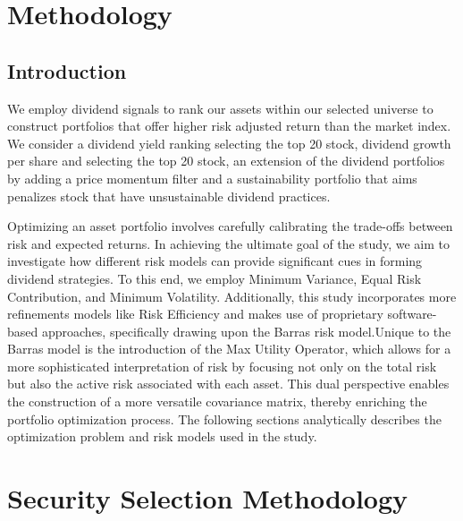 \documentclass[11pt,preprint, authoryear]{elsarticle}
\numberwithin{equation}{section}
\numberwithin{figure}{section}
\numberwithin{table}{section}
\begin{document}
\hypertarget{methodology}{%
\section*{Methodology}\label{methodology}}

\hypertarget{introduction-1}{%
\subsection*{Introduction}\label{introduction-1}}

We employ dividend signals to rank our assets within our selected
universe to construct portfolios that offer higher risk adjusted return
than the market index. We consider a dividend yield ranking selecting
the top 20 stock, dividend growth per share and selecting the top 20
stock, an extension of the dividend portfolios by adding a price
momentum filter and a sustainability portfolio that aims penalizes stock
that have unsustainable dividend practices.

Optimizing an asset portfolio involves carefully calibrating the
trade-offs between risk and expected returns. In achieving the ultimate
goal of the study, we aim to investigate how different risk models can
provide significant cues in forming dividend strategies. To this end, we
employ Minimum Variance, Equal Risk Contribution, and Minimum
Volatility. Additionally, this study incorporates more refinements
models like Risk Efficiency and makes use of proprietary software-based
approaches, specifically drawing upon the Barras risk model.Unique to
the Barras model is the introduction of the Max Utility Operator, which
allows for a more sophisticated interpretation of risk by focusing not
only on the total risk but also the active risk associated with each
asset. This dual perspective enables the construction of a more
versatile covariance matrix, thereby enriching the portfolio
optimization process. The following sections analytically describes the
optimization problem and risk models used in the study.

\hypertarget{security-selection-methodology}{%
\section*{Security Selection
Methodology}\label{security-selection-methodology}}
\end{document}
